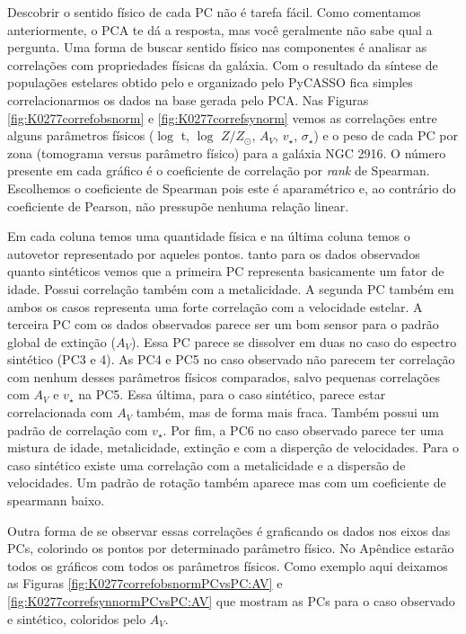 Descobrir o sentido físico de cada PC não é tarefa fácil. Como comentamos anteriormente, o PCA te dá a resposta, mas
você geralmente não sabe qual a pergunta. Uma forma de buscar sentido físico nas componentes é analisar as correlações
com propriedades físicas da galáxia. Com o resultado da síntese de populações estelares obtido pelo \starlight e
organizado pelo PyCASSO fica simples correlacionarmos os dados na base gerada pelo PCA. Nas Figuras
\ref{fig:K0277correfobsnorm} e \ref{fig:K0277correfsynorm} vemos as correlações entre alguns parâmetros
físicos ($\log$ t, $\log$ $Z / Z_{\odot}$, $A_V$, $v_{\star}$, $\sigma_{\star}$) e o peso de cada PC por zona (tomograma
versus parâmetro físico) para a galáxia NGC 2916. O número presente em cada gráfico é o coeficiente de correlação por
{\em rank} de Spearman. Escolhemos o coeficiente de Spearman pois este é aparamétrico e, ao contrário do coeficiente de
Pearson, não pressupõe nenhuma relação linear.

Em cada coluna temos uma quantidade física e na última coluna temos o autovetor representado por aqueles pontos. tanto
para os dados observados quanto sintéticos vemos que a primeira PC representa basicamente um fator de idade. Possui
correlação também com a metalicidade. A segunda PC também em ambos os casos representa uma forte correlação com a
velocidade estelar. A terceira PC com os dados observados parece ser um bom sensor para o padrão global de extinção
($A_V$). Essa PC parece se dissolver em duas no caso do espectro sintético (PC3 e 4). As PC4 e PC5 no caso observado não
parecem ter correlação com nenhum desses parâmetros físicos comparados, salvo pequenas correlações com $A_V$ e $v_\star$
na PC5. Essa última, para o caso sintético, parece estar correlacionada com $A_V$ também, mas de forma mais fraca.
Também possui um padrão de correlação com $v_\star$. Por fim, a PC6 no caso observado parece ter uma mistura de idade,
metalicidade, extinção e com a disperção de velocidades. Para o caso sintético existe uma correlação com a metalicidade
e a dispersão de velocidades. Um padrão de rotação também aparece mas com um coeficiente de spearmann baixo.

Outra forma de se observar essas correlações é graficando os dados nos eixos das PCs, colorindo os pontos por
determinado parâmetro físico. No Apêndice estarão todos os gráficos com todos os parâmetros físicos. Como exemplo aqui
deixamos as Figuras \ref{fig:K0277correfobsnormPCvsPC:AV} e \ref{fig:K0277correfsynnormPCvsPC:AV} que mostram
as PCs para o caso observado e sintético, coloridos pelo $A_V$.

